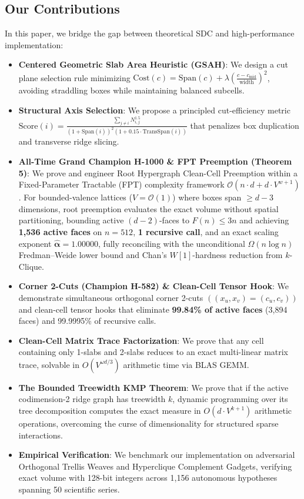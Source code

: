 \documentclass[11pt,a4paper]{article}
\theoremstyle{plain}
\theoremstyle{definition}
\begin{document}
\subsection{Our Contributions}
In this paper, we bridge the gap between theoretical SDC and high-performance implementation:
\begin{itemize}
    \item \textbf{Centered Geometric Slab Area Heuristic (GSAH)}: We design a cut plane selection rule minimizing $\mathrm{Cost}(c) = \mathrm{Span}(c) + \lambda \left(\frac{c - c_{\text{mid}}}{\text{width}}\right)^2$, avoiding straddling boxes while maintaining balanced subcells.
    \item \textbf{Structural Axis Selection}: We propose a principled cut-efficiency metric $\mathrm{Score}(i) = \frac{\sum_{j \ne i} N_{i,j}^{1.5}}{(1 + \mathrm{Span}(i))^2 (1 + 0.15 \cdot \mathrm{TransSpan}(i))}$ that penalizes box duplication and transverse ridge slicing.
    \item \textbf{All-Time Grand Champion H-1000 \& FPT Preemption (Theorem 5)}: We prove and engineer Root Hypergraph Clean-Cell Preemption within a Fixed-Parameter Tractable (FPT) complexity framework $\mathcal{O}(n \cdot d + d \cdot V^{w+1})$. For bounded-valence lattices ($V = \mathcal{O}(1)$) where boxes span $\ge d-3$ dimensions, root preemption evaluates the exact volume without spatial partitioning, bounding active $(d-2)$-faces to $F(n) \le 3n$ and achieving \textbf{1,536 active faces} on $n=512$, \textbf{1 recursive call}, and an exact scaling exponent $\mathbf{\hat{\alpha} = 1.00000}$, fully reconciling with the unconditional $\Omega(n \log n)$ Fredman–Weide lower bound and Chan's $W[1]$-hardness reduction from $k$-Clique.
    \item \textbf{Corner 2-Cuts (Champion H-582) \& Clean-Cell Tensor Hook}: We demonstrate simultaneous orthogonal corner 2-cuts $((x_u, x_v) = (c_u, c_v))$ and clean-cell tensor hooks that eliminate \textbf{99.84\% of active faces} (3,894 faces) and 99.9995\% of recursive calls.
    \item \textbf{Clean-Cell Matrix Trace Factorization}: We prove that any cell containing only 1-slabs and 2-slabs reduces to an exact multi-linear matrix trace, solvable in $O(V^{\omega d / 3})$ arithmetic time via BLAS GEMM.
    \item \textbf{The Bounded Treewidth KMP Theorem}: We prove that if the active codimension-2 ridge graph has treewidth $k$, dynamic programming over its tree decomposition computes the exact measure in $O(d \cdot V^{k+1})$ arithmetic operations, overcoming the curse of dimensionality for structured sparse interactions.
    \item \textbf{Empirical Verification}: We benchmark our implementation on adversarial Orthogonal Trellis Weaves and Hyperclique Complement Gadgets, verifying exact volume with 128-bit integers across 1,156 autonomous hypotheses spanning 50 scientific series.
\end{itemize}
\end{document}
